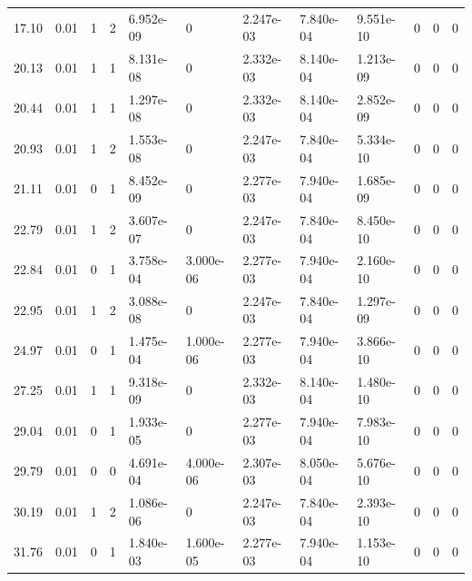 \documentclass[preview]{standalone}
\begin{document}
{{\begin{tabular}{L{1.2cm}C{1.2cm} C{0.3cm}C{0.5cm} C{1.4cm}C{1.4cm} C{1.4cm}C{1.4cm} C{1.6cm}C{1.6cm} C{1.6cm}C{1.6cm}}
  17.10  &  0.01  & 1     &  2 &  6.952e-09  & 0  &  2.247e-03&   7.840e-04& 9.551e-10 & 0   &  0 & 0  \\ 
  20.13  &  0.01  & 1     &  1 &  8.131e-08  & 0  &  2.332e-03&   8.140e-04& 1.213e-09 & 0   &  0 & 0  \\ 
  20.44  &  0.01  & 1     &  1 &  1.297e-08  & 0  &  2.332e-03&   8.140e-04& 2.852e-09 & 0   &  0 & 0  \\ 
  20.93  &  0.01  & 1     &  2 &  1.553e-08  & 0  &  2.247e-03&   7.840e-04& 5.334e-10 & 0   &  0 & 0  \\ 
  21.11  &  0.01  & 0     &  1 &  8.452e-09  & 0  &  2.277e-03&   7.940e-04& 1.685e-09 & 0   &  0 & 0  \\ 
  22.79  &  0.01  & 1     &  2 &  3.607e-07  & 0  &  2.247e-03&   7.840e-04& 8.450e-10 & 0   &  0 & 0  \\ 
  22.84  &  0.01  & 0     &  1 &  3.758e-04  & 3.000e-06  &  2.277e-03&   7.940e-04& 2.160e-10 & 0   &  0 & 0  \\ 
  22.95  &  0.01  & 1     &  2 &  3.088e-08  & 0  &  2.247e-03&   7.840e-04& 1.297e-09 & 0   &  0 & 0  \\ 
  24.97  &  0.01  & 0     &  1 &  1.475e-04  & 1.000e-06  &  2.277e-03&   7.940e-04& 3.866e-10 & 0   &  0 & 0  \\ 
  27.25  &  0.01  & 1     &  1 &  9.318e-09  & 0  &  2.332e-03&   8.140e-04& 1.480e-10 & 0   &  0 & 0  \\ 
  29.04  &  0.01  & 0     &  1 &  1.933e-05  & 0  &  2.277e-03&   7.940e-04& 7.983e-10 & 0   &  0 & 0  \\ 
  29.79  &  0.01  & 0     &  0 &  4.691e-04  & 4.000e-06  &  2.307e-03&   8.050e-04& 5.676e-10 & 0   &  0 & 0  \\ 
  30.19  &  0.01  & 1     &  2 &  1.086e-06  & 0  &  2.247e-03&   7.840e-04& 2.393e-10 & 0   &  0 & 0  \\ 
  31.76  &  0.01  & 0     &  1 &  1.840e-03  & 1.600e-05  &  2.277e-03&   7.940e-04& 1.153e-10 & 0   &  0 & 0  \\ 
\hline 
\end{tabular} 

}}
\end{document}

